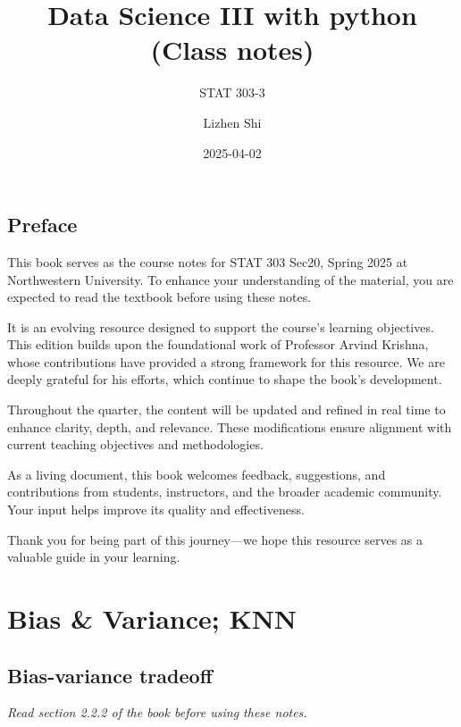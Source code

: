 \documentclass[
  letterpaper,
  DIV=11,
  numbers=noendperiod]{scrreprt}
\title{Data Science III with python (Class notes)}
\subtitle{STAT 303-3}
\author{Lizhen Shi}
\date{2025-04-02}
\renewcommand*\contentsname{Table of contents}
\newcommand\contentsname{Table of contents}
\begin{document}
\maketitle

\renewcommand*\contentsname{Table of contents}
{
\hypersetup{linkcolor=}
\setcounter{tocdepth}{2}
\tableofcontents
}


\chapter*{Preface}\label{preface}


This book serves as the course notes for STAT 303 Sec20, Spring 2025 at
Northwestern University. To enhance your understanding of the material,
you are expected to read the textbook before using these notes.

It is an evolving resource designed to support the course's learning
objectives. This edition builds upon the foundational work of Professor
Arvind Krishna, whose contributions have provided a strong framework for
this resource. We are deeply grateful for his efforts, which continue to
shape the book's development.

Throughout the quarter, the content will be updated and refined in real
time to enhance clarity, depth, and relevance. These modifications
ensure alignment with current teaching objectives and methodologies.

As a living document, this book welcomes feedback, suggestions, and
contributions from students, instructors, and the broader academic
community. Your input helps improve its quality and effectiveness.

Thank you for being part of this journey---we hope this resource serves
as a valuable guide in your learning.

\part{Bias \& Variance; KNN}

\chapter{Bias-variance tradeoff}\label{bias-variance-tradeoff}

\emph{Read section 2.2.2 of the book before using these notes.}
\end{document}
